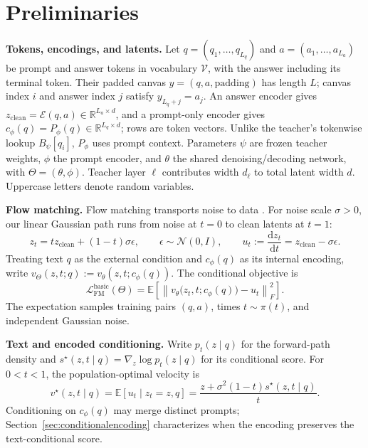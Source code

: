 \documentclass[11pt,letterpaper]{article}
\newcommand{\E}{\mathbb{E}}
\newcommand{\R}{\mathbb{R}}
\begin{document}
\section{Preliminaries}
\label{sec:preliminaries}

\textbf{Tokens, encodings, and latents.}
Let $q=(q_1,\ldots,q_{L_q})$ and $a=(a_1,\ldots,a_{L_a})$ be prompt and answer tokens in vocabulary $\mathcal V$, with the answer including its terminal token. Their padded canvas $y=(q,a,\mathrm{padding})$ has length $L$; canvas index $i$ and answer index $j$ satisfy $y_{L_q+j}=a_j$. An answer encoder gives $z_{\mathrm{clean}}=\mathcal E(q,a)\in\R^{L_a\times d}$, and a prompt-only encoder gives $c_\phi(q)=P_\phi(q)\in\R^{L_q\times d}$; rows are token vectors. Unlike the teacher's tokenwise lookup $B_\psi[q_i]$, $P_\phi$ uses prompt context. Parameters $\psi$ are frozen teacher weights, $\phi$ the prompt encoder, and $\theta$ the shared denoising/decoding network, with $\Theta=(\theta,\phi)$. Teacher layer $\ell$ contributes width $d_\ell$ to total latent width $d$. Uppercase letters denote random variables.

\textbf{Flow matching.}
Flow matching transports noise to data \citep{flowmatching}. For noise scale $\sigma>0$, our linear Gaussian path runs from noise at $t=0$ to clean latents at $t=1$:
\begin{equation}
 z_t=t z_{\mathrm{clean}}+(1-t)\sigma\epsilon,
 \qquad \epsilon\sim\mathcal N(0,I),\qquad
 u_t:=\frac{\mathrm d z_t}{\mathrm d t}=z_{\mathrm{clean}}-\sigma\epsilon.
 \label{eq:methodinterpolant}
\end{equation}
Treating text $q$ as the external condition and $c_\phi(q)$ as its internal encoding, write $v_\Theta(z,t;q):=v_\theta(z,t;c_\phi(q))$. The conditional objective is
\begin{equation}
 \mathcal L_{\mathrm{FM}}^{\mathrm{basic}}(\Theta)
 =\E\!\left[\left\|v_\theta\bigl(z_t,t;c_\phi(q)\bigr)-u_t\right\|_F^2\right].
 \label{eq:basicflowloss}
\end{equation}
The expectation samples training pairs $(q,a)$, times $t\sim\pi(t)$, and independent Gaussian noise.

\textbf{Text and encoded conditioning.}
Write $p_t(z\mid q)$ for the forward-path density and $s^\star(z,t\mid q)=\nabla_z\log p_t(z\mid q)$ for its conditional score. For $0<t<1$, the population-optimal velocity is
\begin{equation}
 v^\star(z,t\mid q)
 =\E[u_t\mid z_t=z,q]
 =\frac{z+\sigma^2(1-t)s^\star(z,t\mid q)}{t}.
 \label{eq:conditionalflowscore}
\end{equation}
Conditioning on $c_\phi(q)$ may merge distinct prompts; Section~\ref{sec:conditionalencoding} characterizes when the encoding preserves the text-conditional score.
\end{document}
